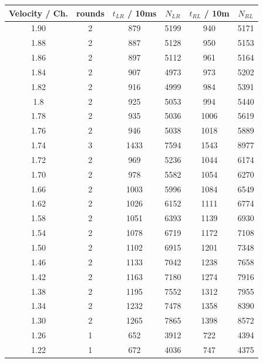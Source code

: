 \documentclass[11pt,a4paper,notitlepage]{scrartcl}
\begin{document}
\begin{table}[H]
	\centering
	\ContinuedFloat
	\begin{tabular}{c|c|c|c|c|c}
		Velocity / Ch. & rounds & $t_{LR}$  / 10ms & $N_{LR}$  &$t_{RL}$  / 10m & $N_{RL}$  \\
		\hline
		1.90 & 2      & 879         & 5199  & 940         & 5171  \\
		1.88 & 2      & 887         & 5128  & 950         & 5153  \\
		1.86 & 2      & 897         & 5112  & 961         & 5164  \\
		1.84 & 2      & 907         & 4973  & 973         & 5202  \\
		1.82 & 2      & 916         & 4999  & 984         & 5391  \\
		1.8  & 2      & 925         & 5053  & 994         & 5440  \\
		1.78 & 2      & 935         & 5036  & 1006        & 5619  \\
		1.76 & 2      & 946         & 5038  & 1018        & 5889  \\
		1.74 & 3      & 1433        & 7594  & 1543        & 8977  \\
		1.72 & 2      & 969         & 5236  & 1044        & 6174  \\
		1.70 & 2      & 978         & 5582  & 1054        & 6270  \\
		1.66 & 2      & 1003        & 5996  & 1084        & 6549  \\
		1.62 & 2      & 1026        & 6152  & 1111        & 6774  \\
		1.58 & 2      & 1051        & 6393  & 1139        & 6930  \\
		1.54 & 2      & 1078        & 6719  & 1172        & 7108  \\
		1.50 & 2      & 1102        & 6915  & 1201        & 7348  \\
		1.46 & 2      & 1133        & 7042  & 1238        & 7658  \\
		1.42 & 2      & 1163        & 7180  & 1274        & 7916  \\
		1.38 & 2      & 1195        & 7552  & 1312        & 7955  \\
		1.34 & 2      & 1232        & 7478  & 1358        & 8390  \\
		1.30 & 2      & 1265        & 7865  & 1398        & 8572  \\
		1.26 & 1      & 652         & 3912  & 722         & 4394  \\
		1.22 & 1      & 672         & 4036  & 747         & 4375  \\

\end{tabular}
\end{table}
\end{document}
